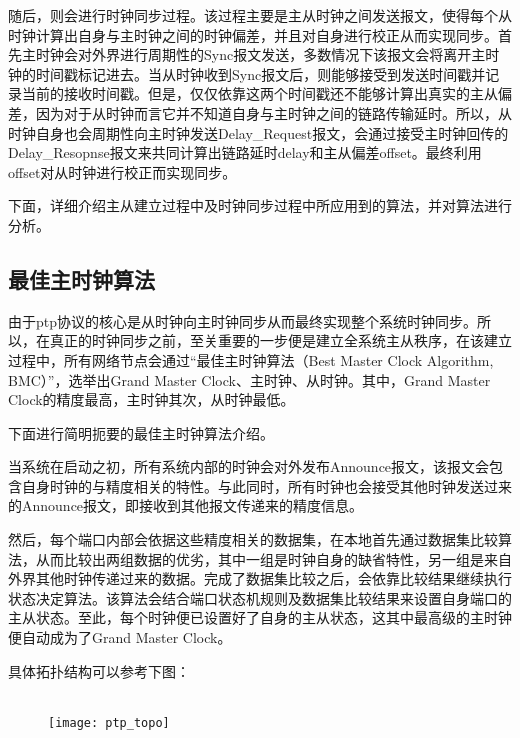 随后，则会进行时钟同步过程。该过程主要是主从时钟之间发送报文，使得每个从时钟计算出自身与主时钟之间的时钟偏差，并且对自身进行校正从而实现同步。首先主时钟会对外界进行周期性的Sync报文发送，多数情况下该报文会将离开主时钟的时间戳标记进去。当从时钟收到Sync报文后，则能够接受到发送时间戳并记录当前的接收时间戳。但是，仅仅依靠这两个时间戳还不能够计算出真实的主从偏差，因为对于从时钟而言它并不知道自身与主时钟之间的链路传输延时。所以，从时钟自身也会周期性向主时钟发送Delay\_Request报文，会通过接受主时钟回传的Delay\_Resopnse报文来共同计算出链路延时delay和主从偏差offset。最终利用offset对从时钟进行校正而实现同步。

下面，详细介绍主从建立过程中及时钟同步过程中所应用到的算法，并对算法进行分析。

\subsection{最佳主时钟算法}
\label{sec:1588_theory_bmc}
由于ptp协议的核心是从时钟向主时钟同步从而最终实现整个系统时钟同步。所以，在真正的时钟同步之前，至关重要的一步便是建立全系统主从秩序，在该建立过程中，所有网络节点会通过“最佳主时钟算法（Best Master Clock Algorithm, BMC）”，选举出Grand Master Clock、主时钟、从时钟。其中，Grand Master Clock的精度最高，主时钟其次，从时钟最低。

下面进行简明扼要的最佳主时钟算法介绍。

当系统在启动之初，所有系统内部的时钟会对外发布Announce报文，该报文会包含自身时钟的与精度相关的特性。与此同时，所有时钟也会接受其他时钟发送过来的Announce报文，即接收到其他报文传递来的精度信息。

然后，每个端口内部会依据这些精度相关的数据集，在本地首先通过数据集比较算法，从而比较出两组数据的优劣，其中一组是时钟自身的缺省特性，另一组是来自外界其他时钟传递过来的数据。完成了数据集比较之后，会依靠比较结果继续执行状态决定算法。该算法会结合端口状态机规则及数据集比较结果来设置自身端口的主从状态。至此，每个时钟便已设置好了自身的主从状态，这其中最高级的主时钟便自动成为了Grand Master Clock。

具体拓扑结构可以参考下图：
\\
\\
\begin{figure}[htbp]
  \centering
  \begin{minipage}[b]{0.6\textwidth}
    \captionstyle{\centering}
    \centering
    \texttt{[image: ptp\_topo]}
  \end{minipage}     
\end{figure}

